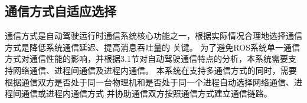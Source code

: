 \subsection{通信方式自适应选择}
通信方式是自动驾驶运行时通信系统核心功能之一，根据实际情况合理地选择通信方式是降低系统通信延迟、提高消息吞吐量的
关键。
为了避免ROS系统单一通信方式对通信性能的影响，并根据3.1节对自动驾驶通信特点的分析，本系统需要支持网络通信、进程间通信及进程内通信。
本系统在支持多通信方式的同时，需要根据通信双方是否处于同一台物理机和是否处于同一个进程自动选择网络通信、进程间通信或进程内通信方式
并协助通信双方按照通信方式建立通信链路。





